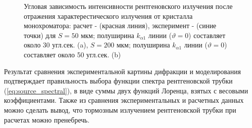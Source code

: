 \begin{figure}[H]
  \centering
  \hfill
  \caption{Угловая зависимость интенсивности рентгеновского излучения
  после отражения характерестического излучения от кристалла монохроматора:
  расчет -  (красная линия), эксперимент - (синие точки) для $S = 50$ мкм; полуширина $k_{\alpha 1}$ линии ($\vartheta=0$)
   составляет около 30 угл.сек. (a), $S = 200$ мкм; полуширина $k_{\alpha 1}$ линии ($\vartheta=0$)
   составляет около 50 угл.сек. (b)}
  \label{ris:zero_exp}
\end{figure}

Результат сравнения экспериментальной картины дифракции и моделирования
подтверждает правильность выбора функции спектра рентгеновской трубки (\ref{eq:source_spectral}),
в виде суммы двух функций Лоренца, взятых с весовыми коэффициентами. Также из
сравнения экспериментальных и расчетных данных можно сделать вывод, что тормозным
излучением рентгеновской трубки при расчетах можно пренебречь.
